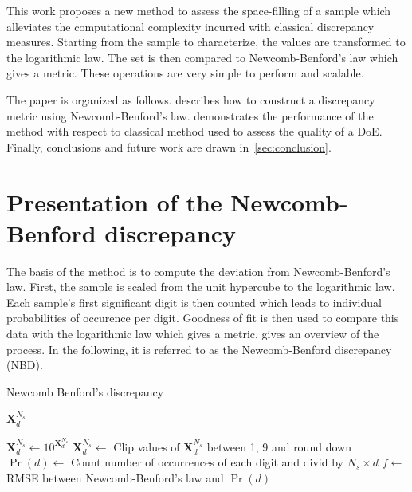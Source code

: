 \documentclass[1p,authoryear]{elsarticle}
\begin{document}
This work proposes a new method to assess the space-filling of a sample which alleviates the computational complexity incurred with classical discrepancy measures. Starting from the sample to characterize, the values are transformed to the logarithmic law. The set is then compared to Newcomb-Benford's law which gives a metric. These operations are very simple to perform and scalable.

The paper is organized as follows.  describes how to construct a discrepancy metric using Newcomb-Benford's law.  demonstrates the performance of the method with respect to classical method used to assess the quality of a DoE.
Finally, conclusions and future work are drawn in~\cref{sec:conclusion}.


\section{Presentation of the Newcomb-Benford discrepancy} \label{sec:method}

The basis of the method is to compute the deviation from Newcomb-Benford's law. First, the sample is scaled from the unit hypercube to the logarithmic law. Each sample's first significant digit is then counted which leads to individual probabilities of occurence per digit. Goodness of fit is then used to compare this data with the logarithmic law which gives a metric.  gives an overview of the process. In the following, it is referred to as the Newcomb-Benford discrepancy (NBD). 

\begin{algorithm}
  \caption{Newcomb Benford's discrepancy}
  \label{alg:nbd}
  \begin{algorithmic}[1]
  \Require $\mathbf{X}^{N_s}_d$
  
  \State $\mathbf{X}^{N_s}_d \gets 10^{\mathbf{X}^{N_s}_d}$ 
  \State $\mathbf{X}^{N_s}_d \gets$ Clip values of $\mathbf{X}^{N_s}_d$ between 1, 9 and round down
  \State $\Pr(d) \gets$ Count number of occurrences of each digit and divid by $N_s \times d$
  \State $f \gets$ RMSE between Newcomb-Benford's law and $\Pr(d)$

  \end{algorithmic}
\end{algorithm}
\end{document}
